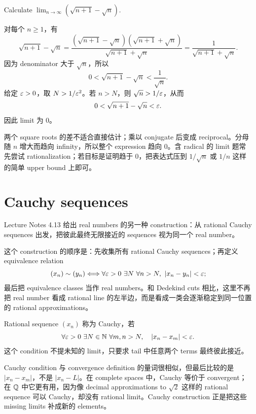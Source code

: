 \begin{exerciseblock}
Calculate \(\lim_{n\to\infty}(\sqrt{n+1}-\sqrt n)\).
\end{exerciseblock}

\begin{solution}
对每个 \(n\geq1\)，有
\[
  \sqrt{n+1}-\sqrt n
  =\frac{(\sqrt{n+1}-\sqrt n)(\sqrt{n+1}+\sqrt n)}
         {\sqrt{n+1}+\sqrt n}
  =\frac1{\sqrt{n+1}+\sqrt n}.
\]
因为 denominator 大于 \(\sqrt n\)，所以
\[
  0<\sqrt{n+1}-\sqrt n<\frac1{\sqrt n}.
\]
给定 \(\varepsilon>0\)，取 \(N>1/\varepsilon^2\)。若 \(n>N\)，则 \(\sqrt n>1/\varepsilon\)，从而
\[
  0<\sqrt{n+1}-\sqrt n<\varepsilon.
\]
因此 limit 为 \(0\)。
\end{solution}

\begin{explanation}
两个 square roots 的差不适合直接估计；乘以 conjugate 后变成 reciprocal。分母随
\(n\) 增大而趋向 infinity，所以整个 expression 趋向 \(0\)。含 radical 的 limit
题常先尝试 rationalization；若目标是证明趋于 \(0\)，把表达式压到
\(1/\sqrt n\) 或 \(1/n\) 这样的简单 upper bound 上即可。
\end{explanation}

\section{Cauchy sequences \optional}

Lecture Notes 4.13 给出 real numbers 的另一种 construction：从 rational Cauchy
sequences 出发，把彼此最终无限接近的 sequences 视为同一个 real number。

这个 construction 的顺序是：先收集所有 rational Cauchy sequences；再定义
equivalence relation
\[
  (x_n)\sim(y_n)
  \Longleftrightarrow
  \forall\eps>0\ \exists N\ \forall n>N,\ |x_n-y_n|<\eps;
\]
最后把 equivalence classes 当作 real numbers。和 Dedekind cuts 相比，这里不再把
real number 看成 rational line 的左半边，而是看成一类会逐渐稳定到同一位置的
rational approximations。

\begin{definition}
Rational sequence \((x_n)\) 称为 Cauchy，若
\[
  \forall\varepsilon>0\ \exists N\in\mathbb{N}\ \forall m,n>N,\quad |x_n-x_m|<\varepsilon.
\]
这个 condition 不提未知的 limit，只要求 tail 中任意两个 terms 最终彼此接近。
\end{definition}

Cauchy condition 与 convergence definition 的量词很相似，但最后比较的是
\(|x_n-x_m|\)，不是 \(|x_n-L|\)。在 complete spaces 中，Cauchy 等价于
convergent；在 \(\mathbb{Q}\) 中它更有用，因为像 decimal approximations to \(\sqrt2\)
这样的 rational sequence 可以 Cauchy，却没有 rational limit。Cauchy construction
正是把这些 missing limits 补成新的 elements。

